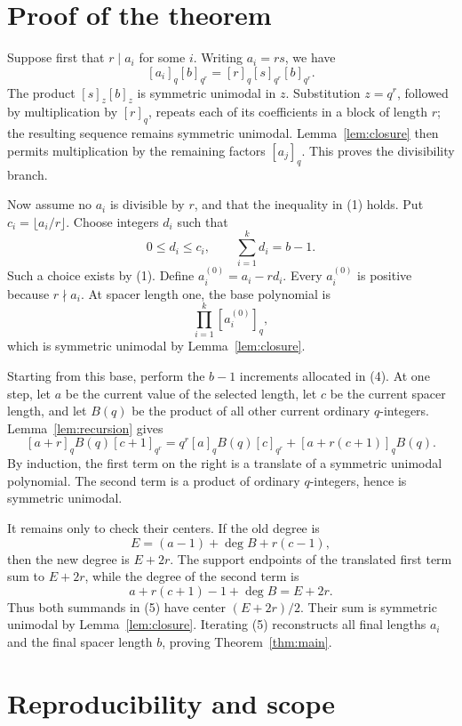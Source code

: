 \documentclass[11pt]{article}
\begin{document}
\section{Proof of the theorem}

Suppose first that \(r\mid a_i\) for some \(i\).  Writing \(a_i=rs\), we
have
\[
 [a_i]_q[b]_{q^r}
 =[r]_q[s]_{q^r}[b]_{q^r}.
\]
The product \([s]_z[b]_z\) is symmetric unimodal in \(z\).  Substitution
\(z=q^r\), followed by multiplication by \([r]_q\), repeats each of its
coefficients in a block of length \(r\); the resulting sequence remains
symmetric unimodal.  Lemma~\ref{lem:closure} then permits multiplication by
the remaining factors \([a_j]_q\).  This proves the divisibility branch.

Now assume no \(a_i\) is divisible by \(r\), and that the inequality in (1)
holds.  Put \(c_i=\lfloor a_i/r\rfloor\).  Choose integers \(d_i\) such
that
\[
 0\leq d_i\leq c_i,
 \qquad \sum_{i=1}^k d_i=b-1.                      \tag{4}
\]
Such a choice exists by (1).  Define \(a_i^{(0)}=a_i-rd_i\).  Every
\(a_i^{(0)}\) is positive because \(r\nmid a_i\).  At spacer length one,
the base polynomial is
\[
 \prod_{i=1}^k[a_i^{(0)}]_q,
\]
which is symmetric unimodal by Lemma~\ref{lem:closure}.

Starting from this base, perform the \(b-1\) increments allocated in (4).
At one step, let \(a\) be the current value of the selected length, let
\(c\) be the current spacer length, and let \(B(q)\) be the product of all
other current ordinary \(q\)-integers.  Lemma~\ref{lem:recursion} gives
\[
 [a+r]_q B(q)[c+1]_{q^r}
 =q^r[a]_qB(q)[c]_{q^r}
  +[a+r(c+1)]_qB(q).                               \tag{5}
\]
By induction, the first term on the right is a translate of a symmetric
unimodal polynomial.  The second term is a product of ordinary
\(q\)-integers, hence is symmetric unimodal.

It remains only to check their centers.  If the old degree is
\[
 E=(a-1)+\deg B+r(c-1),
\]
then the new degree is \(E+2r\).  The support endpoints of the translated
first term sum to \(E+2r\), while the degree of the second term is
\[
 a+r(c+1)-1+\deg B=E+2r.
\]
Thus both summands in (5) have center \((E+2r)/2\).  Their sum is symmetric
unimodal by Lemma~\ref{lem:closure}.  Iterating (5) reconstructs all final
lengths \(a_i\) and the final spacer length \(b\), proving
Theorem~\ref{thm:main}.

\section{Reproducibility and scope}
\end{document}
